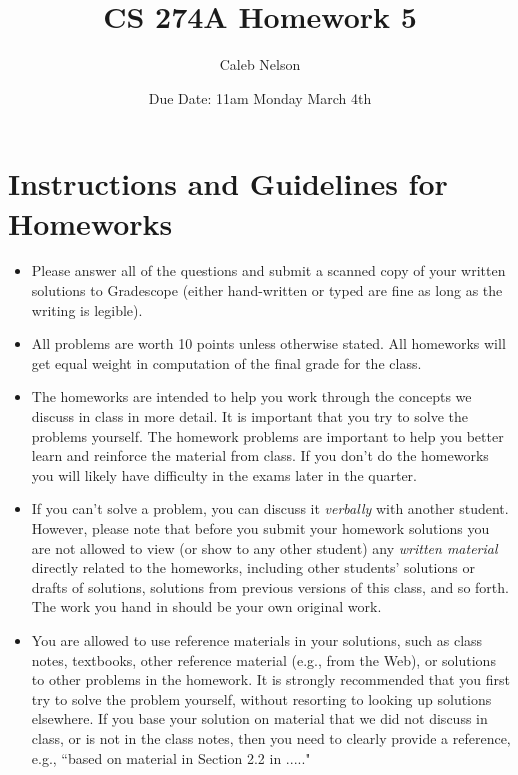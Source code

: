 \documentclass[11pt]{article}
\begin{document}
\setlength{\parskip}{1.2ex plus0.3ex minus 0.3ex}


\thispagestyle{empty} \pagestyle{myheadings} 



\title{CS 274A Homework 5}
\author{Caleb Nelson}
\date{Due Date:  11am  Monday March 4th}

\maketitle


\section*{Instructions and Guidelines for Homeworks}
 \begin{itemize}

\item
Please answer all of the questions and submit a scanned copy of your written solutions to Gradescope 
(either hand-written or typed are fine as long as the writing is legible). 

\item
All problems are worth 10 points unless otherwise stated.  All homeworks will get equal weight in computation of the final grade for the class.
 \item
The homeworks are intended to help you work through the concepts
we discuss in class in  more detail. It is important that you try
to solve the problems yourself. The homework problems are important to help you better
learn and reinforce the material from class. If you don't
do the homeworks you will likely have difficulty in the exams
later in the quarter.

\item If you can't solve a
problem, you can discuss it {\it verbally} with another student. However, please note that before you submit your homework solutions you
are not allowed to view (or show to any other student) any {\it written material} directly related to the homeworks, including other students' solutions or drafts of solutions, solutions from previous versions of this class, and so forth. The work you hand in should be your own original work.

\item You are allowed to use reference materials in your solutions, such as class notes, textbooks,  other reference material (e.g., from the Web), or solutions to other problems in the homework. It is strongly recommended that you first try to solve the problem yourself, without resorting to looking up solutions elsewhere. If you base your solution on material that we did not discuss in class, or is not in the class notes, then you need to clearly provide a reference, e.g., ``based on material in Section 2.2 in ....."



\end{itemize}
\end{document}
